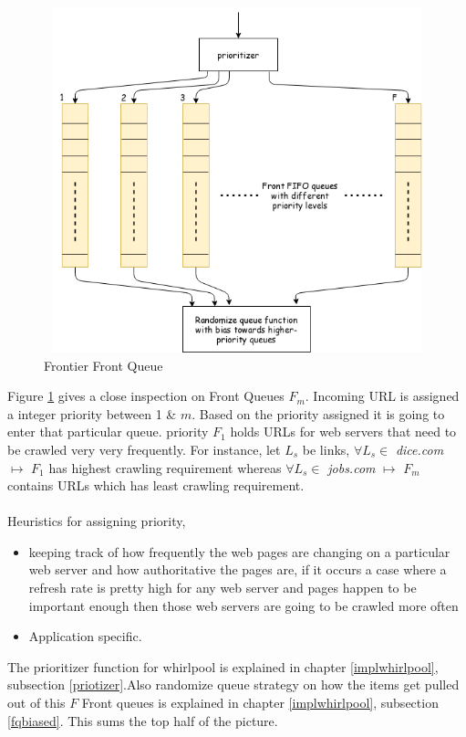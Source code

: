 \pagebreak

\begin{figure}[h!]
  \centering
  \includegraphics[width=13cm,height=10cm,keepaspectratio]{../media/crawler/f-queue.png}
  \caption{Frontier Front Queue}
  \label{fig:fqueue}
\end{figure}

\noindent
Figure \ref{fig:fqueue} gives a close inspection on Front Queues $F_m$. Incoming URL is assigned a integer  priority between 1 \& $m$. Based on the priority assigned it is going to enter that particular queue.
priority $F_1$ holds URLs for web servers that need to be crawled very very frequently. For instance,
let $L_s$ be links, $\forall L_s \in $ \textit{dice.com} $ \longmapsto $ $F_1$ has highest crawling requirement whereas $\forall L_s \in $ \textit{jobs.com} $ \longmapsto $ $F_m$ contains URLs which has least
crawling requirement. 
\\
\\
Heuristics for assigning priority,
\begin{itemize}
\item keeping track of how frequently the web pages are changing on a particular web server and how authoritative the pages are, if it occurs a case where a refresh rate is pretty high for any web server and pages happen to be important enough then those web servers are going to be crawled more often
\item Application specific. 
\end{itemize}

\noindent
The prioritizer function for whirlpool is explained in chapter \ref{implwhirlpool}, subsection \ref{priotizer}.Also randomize queue strategy on how the items get pulled out of this $F$ Front queues is explained in chapter \ref{implwhirlpool}, subsection \ref{fqbiased}. This sums the top half of the picture.

